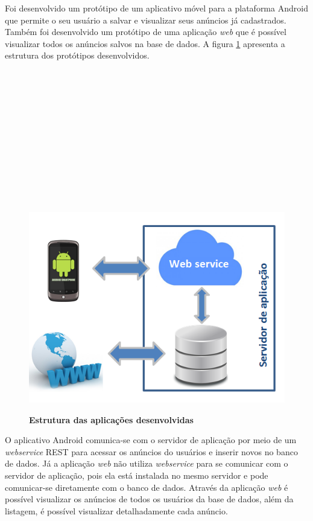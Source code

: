 \documentclass[
	12pt,				%
	openright,			%
	oneside,			%
	a4paper,			%
	chapter=TITLE,		%
	section=TITLE,		%
	english,			%
	french,				%
	spanish,			%
	brazil				%
	]{abntex2}
\begin{document}
Foi desenvolvido um protótipo de um aplicativo móvel para a plataforma Android que permite o seu usuário a salvar e visualizar seus anúncios já cadastrados. Também foi desenvolvido um protótipo de uma aplicação \textit{web} que é possível visualizar todos os anúncios salvos na base de dados. A figura \ref{fig-estrutura-aplicacoes} apresenta a estrutura dos protótipos desenvolvidos. \\ \\ \\ \\ \\ \\ \\ \\ \\ \\ \\ \\ \\

\begin{figure}[h]
	\begin{center}
		\caption{
			\textbf{Estrutura das aplicações desenvolvidas}
		}\label{fig-estrutura-aplicacoes}
		\includegraphics [scale=0.7]{imagens/arquitetura.png}
		\label{fig-estrutura-aplicacoes}
	\end{center}
\end{figure}

O aplicativo Android comunica-se com o servidor de aplicação por meio de um \textit{webservice} REST para acessar os anúncios do usuários e inserir novos no banco de dados. Já a aplicação \textit{web} não utiliza \textit{webservice} para se comunicar com o servidor de aplicação, pois ela está instalada no mesmo servidor e pode comunicar-se diretamente com o banco de dados. Através da aplicação \textit{web} é possível visualizar os anúncios de todos os usuários da base de dados, além da listagem, é possível visualizar detalhadamente cada anúncio. 
\end{document}
